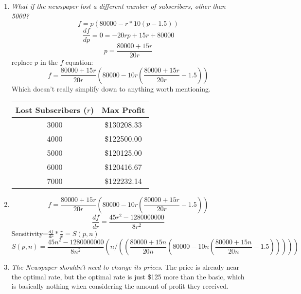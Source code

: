 \documentclass{article}
\begin{document}
\begin{enumerate}[label=\alph*]
    \item \endgraf \bigskip
        \emph{What if the newspaper lost a different number of subscribers, other than 5000?}
        $$f=p(80000-r*10(p-1.5))$$
        $$\frac{df}{dp}=0=-20rp+15r+80000$$
        $$p=\frac{80000+15r}{20r}$$
        replace $p$ in the $f$ equation:
        $$f=\frac{80000+15r}{20r}\left(80000-10r\left(\frac{80000+15r}{20r}-1.5\right)\right)$$
        Which doesn't really simplify down to anything worth mentioning.
        \begin{center}
                \begin{tabular}{ |c|c| } 
                \hline 
                Lost Subscribers ($r$) & Max Profit \\
                \hline
                3000 &\$130208.33\\
                4000 &\$122500.00\\
                5000 &\$120125.00\\
                6000 &\$120416.67\\
                7000 &\$122232.14\\
                
                
            \hline
        \end{tabular}
    \end{center}
    \item
    $$f=\frac{80000+15r}{20r}\left(80000-10r\left(\frac{80000+15r}{20r}-1.5\right)\right)$$
    $$\frac{df}{dr}=\frac{45r^2-1280000000}{8r^2}$$
    Sensitivity=$\frac{df}{dr}*\frac{r}{x}=S(p,n)$
    $$S(p,n)=\frac{45n^2-1280000000}{8n^2}\left(n/\left(\left(\frac{80000+15n}{20n}\left(80000-10n\left(\frac{80000+15n}{20n}-1.5\right)\right)\right)\right)\right)$$
    \item \emph{The Newspaper shouldn't need to change its prices.} The price is already near the optimal rate, but the optimal rate is just \$125 more than the basic, which is basically nothing when considering the amount of profit they received.
    
\end{enumerate}
\end{document}
